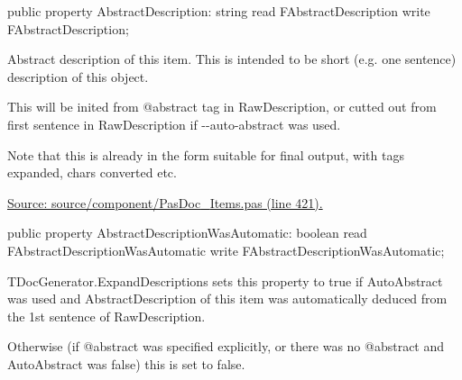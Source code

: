 \documentclass{report}
\newif\ifpdf
\begin{document}
\begin{list}{}{
\setlength{\itemindent}{0cm}
\setlength{\listparindent}{0cm}
\setlength{\leftmargin}{\evensidemargin}
\addtolength{\leftmargin}{\tmplength}
\settowidth{\labelsep}{X}
\addtolength{\leftmargin}{\labelsep}
\setlength{\labelwidth}{\tmplength}
}
\label{PasDoc_Items.TPasItem-AbstractDescription}
\item[\textbf{AbstractDescription}\hfill]
\ifpdf
\begin{flushleft}
\fi
\begin{ttfamily}
public property AbstractDescription: string
      read FAbstractDescription write FAbstractDescription;\end{ttfamily}

\ifpdf
\end{flushleft}
\fi


\par Abstract description of this item. This is intended to be short (e.g. one sentence) description of this object.

This will be inited from @abstract tag in RawDescription, or cutted out from first sentence in RawDescription if {-}{-}auto{-}abstract was used.

Note that this is already in the form suitable for final output, with tags expanded, chars converted etc.\par
\href{https://github.com/pasdoc/pasdoc/blob/master/source/component/PasDoc_Items.pas#L421}{Source: source/component/PasDoc{\_}Items.pas (line 421).}\label{PasDoc_Items.TPasItem-AbstractDescriptionWasAutomatic}
\item[\textbf{AbstractDescriptionWasAutomatic}\hfill]
\ifpdf
\begin{flushleft}
\fi
\begin{ttfamily}
public property AbstractDescriptionWasAutomatic: boolean
      read FAbstractDescriptionWasAutomatic
      write FAbstractDescriptionWasAutomatic;\end{ttfamily}

\ifpdf
\end{flushleft}
\fi


\par TDocGenerator.ExpandDescriptions sets this property to true if AutoAbstract was used and AbstractDescription of this item was automatically deduced from the 1st sentence of RawDescription.

Otherwise (if @abstract was specified explicitly, or there was no @abstract and AutoAbstract was false) this is set to false.


\end{list}
\end{document}
